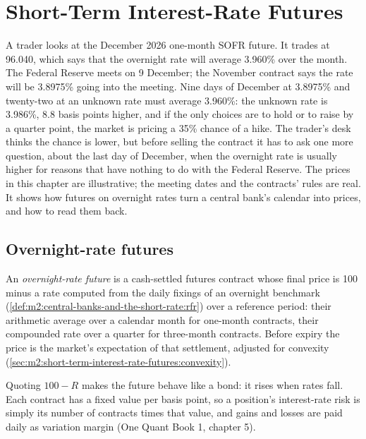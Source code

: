 \chapter{Short-Term Interest-Rate Futures}\label{ch:m2:short-term-interest-rate-futures}

A trader looks at the December 2026 one-month SOFR future. It trades at 96.040,
which says that the overnight rate will average 3.960\% over the month. The
Federal Reserve meets on 9 December; the November contract says the rate will
be 3.8975\% going into the meeting. Nine days of December at 3.8975\% and
twenty-two at an unknown rate must average 3.960\%: the unknown rate is
3.986\%, 8.8 basis points higher, and if the only choices are to hold or to
raise by a quarter point, the market is pricing a 35\% chance of a hike. The
trader's desk thinks the chance is lower, but before selling the contract it
has to ask one more question, about the last day of December, when the
overnight rate is usually higher for reasons that have nothing to do with the
Federal Reserve. The prices in this chapter are illustrative; the meeting dates
and the contracts' rules are real. It shows how futures on overnight rates
turn a central bank's calendar into prices, and how to read them back.

\section{Overnight-rate futures}

\begin{definition}\label{def:m2:short-term-interest-rate-futures:future}
An \emph{overnight-rate future} is a cash-settled
futures contract whose final price is 100 minus a rate computed from the daily
fixings of an overnight benchmark (\cref{def:m2:central-banks-and-the-short-rate:rfr})
over a reference period: their arithmetic average over a calendar month for
one-month contracts, their compounded rate over a quarter for three-month
contracts. Before expiry the price is the market's expectation of that
settlement, adjusted for convexity (\cref{sec:m2:short-term-interest-rate-futures:convexity}).
\end{definition}

Quoting $100 - R$ makes the future behave like a bond: it rises when rates
fall. Each contract has a fixed value per basis point, so a position's
interest-rate risk is simply its number of contracts times that value, and
gains and losses are paid daily as variation margin (One Quant Book 1,
chapter 5).

